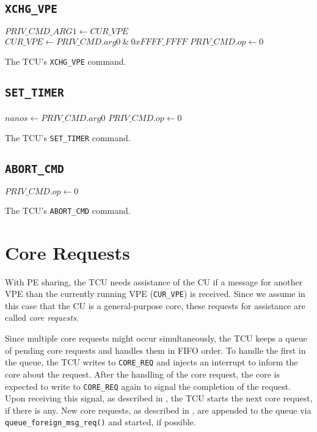 \subsection{\texttt{XCHG\_VPE}}

\begin{algorithm}[H]
    $PRIV\_CMD\_ARG1 \gets CUR\_VPE$\;
    $CUR\_VPE \gets PRIV\_CMD.arg0\ \&\ 0xFFFF\_FFFF$\;
    \BlankLine
    $PRIV\_CMD.op \gets 0$\;
    \caption{The TCU's \texttt{XCHG\_VPE} command.}
\end{algorithm}

\subsection{\texttt{SET\_TIMER}}

\begin{algorithm}[H]
    $nanos \gets PRIV\_CMD.arg0$\;
    \BlankLine
    $PRIV\_CMD.op \gets 0$\;
    \caption{The TCU's \texttt{SET\_TIMER} command.}
\end{algorithm}

\subsection{\texttt{ABORT\_CMD}}

\begin{algorithm}[H]
    \BlankLine
    $PRIV\_CMD.op \gets 0$\;
    \caption{The TCU's \texttt{ABORT\_CMD} command.}
\end{algorithm}

\section{Core Requests}

With PE sharing, the TCU needs assistance of the CU if a message for another VPE than the currently
running VPE (\texttt{CUR\_VPE}) is received. Since we assume in this case that the CU is a
general-purpose core, these requests for assistance are called \emph{core requests}.

Since multiple core requests might occur simultaneously, the TCU keeps a queue of pending core
requests and handles them in FIFO order. To handle the first in the queue, the TCU writes to
\texttt{CORE\_REQ} and injects an interrupt to inform the core about the request. After the handling
of the core request, the core is expected to write to \texttt{CORE\_REQ} again to signal the
completion of the request. Upon receiving this signal, as described in ,
the TCU starts the next core request, if there is any. New core requests, as described in
, are appended to the queue via \texttt{queue\_foreign\_msg\_req()} and
started, if possible.

